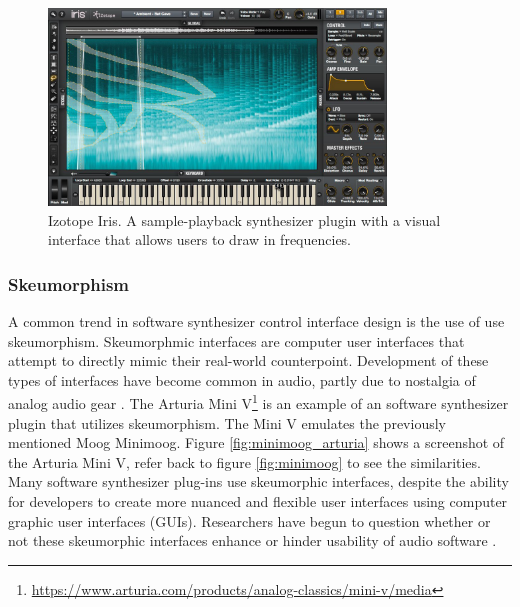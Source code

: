 \begin{figure}[ht]
    \centering
    \includegraphics[width=0.80\textwidth]{figures/background/izotope_iris.jpg}
    \caption{Izotope Iris. A sample-playback synthesizer plugin with a visual interface that allows users to draw in frequencies.}
    \label{fig:izotope_iris}
\end{figure}

\subsubsection{Skeumorphism}
A common trend in software synthesizer control interface design is the use of use skeumorphism. Skeumorphmic interfaces are computer user interfaces that attempt to directly mimic their real-world counterpoint. Development of these types of interfaces have become common in audio, partly due to nostalgia of analog audio gear \cite{stuhl2014reactions}. The Arturia Mini V\footnote{\url{https://www.arturia.com/products/analog-classics/mini-v/media}} is an example of an software synthesizer plugin that utilizes skeumorphism. The Mini V emulates the previously mentioned Moog Minimoog. Figure \ref{fig:minimoog_arturia} shows a screenshot of the Arturia Mini V, refer back to figure \ref{fig:minimoog} to see the similarities. Many software synthesizer plug-ins use skeumorphic interfaces, despite the ability for developers to create more nuanced and flexible user interfaces using computer graphic user interfaces (GUIs). %
Researchers have begun to question whether or not these skeumorphic interfaces enhance or hinder usability of audio software \cite{lindh2018beyond}. 

